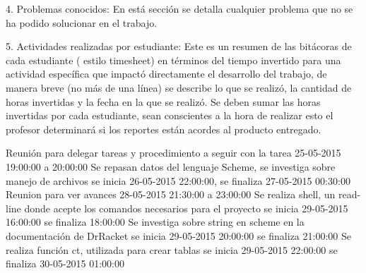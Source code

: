 \documentclass[12pt,a4paper]{report}
\begin{document}
\begin{flushleft}

4. Problemas conocidos: En está sección se detalla cualquier problema que no se ha podido solucionar en el trabajo.

\end{flushleft}

\begin{flushleft}
5. Actividades realizadas por estudiante: Este es un resumen de las bitácoras de cada estudiante ( estilo timesheet) en términos del tiempo invertido para
una actividad específica que impactó directamente el desarrollo del trabajo, de manera breve (no más de una línea) se describe lo que se realizó, la
cantidad de horas invertidas y la fecha en la que se realizó. Se deben sumar las horas invertidas por cada estudiante, sean conscientes a la hora de
realizar esto el profesor determinará si los reportes están acordes al producto entregado.

Reunión para delegar tareas y procedimiento a seguir con la tarea 25-05-2015 19:00:00 a 20:00:00
Se repasan datos del lenguaje Scheme, se investiga sobre manejo de archivos se inicia 26-05-2015 22:00:00, se finaliza 27-05-2015 00:30:00
Reunion para ver avances 28-05-2015 21:30:00 a 23:00:00
Se realiza shell, un read-line donde acepte los comandos necesarios para el proyecto se inicia 29-05-2015 16:00:00 se finaliza 18:00:00
Se investiga sobre string en scheme en la documentación de DrRacket se inicia 29-05-2015 20:00:00 se finaliza 21:00:00
Se realiza función ct, utilizada para crear tablas se inicia 29-05-2015 22:00:00 se finaliza 30-05-2015 01:00:00 


\end{flushleft}
\end{document}
